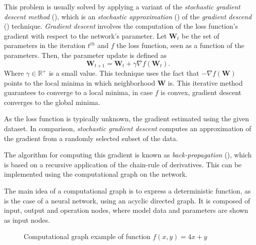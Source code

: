 This problem is usually solved by applying a variant of the \emph{stochastic gradient descent method} (\cite{kiefer1952stochastic}), which is an \emph{stochastic approximation} (\cite{Robbins2007ASA}) of the \emph{gradient descend} (\cite{cauchy1847methode}) technique. \emph{Gradient descent} involves the computation of the loss function's gradient with respect to the network's parameter. Let \(\bm{W}_{t}\) be the set of parameters in the iteration \(t^{th}\) and \(f\) the loss function, seen as a function of the parameters. Then, the parameter update is defined as
\[
  \bm{W}_{t+1} = \bm{W}_{t} + \gamma \nabla f(\bm{W}_{t}).
\]
Where \(\gamma \in \mathbb{R}^{+}\) is a small value. This technique uses the fact that \(- \nabla f(\bm{W})\) points to the local minima in which neighborhood \(\bm{W}\) is. This iterative method guarantees to converge to a local minima, in case \(f\) is convex, gradient descent converges to the global minima.

As the loss function is typically unknown, the gradient estimated using the given dataset. In comparison, \emph{stochastic gradient descent} computes an approximation of the gradient from a randomly selected subset of the data.

The algorithm for computing this gradient is known as \emph{back-propagation} (\cite{goodfellow2016deep}), which is based on a recursive application of the chain-rule of derivatives. This can be implemented using the computational graph on the network.

The main idea of a computational graph is to express a deterministic function, as is the case of a neural network, using an acyclic directed graph. It is composed of input, output and operation nodes, where model data and parameters are shown as input nodes.

\begin{figure}[H]
  \centering
  \caption{Computational graph example of function \(f(x,y) = 4x + y\) }\label{fig:cnn_cg}
\end{figure}

